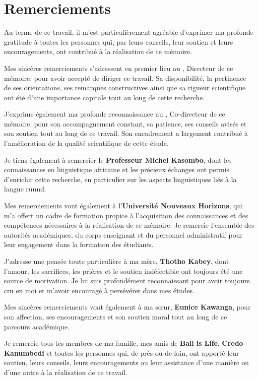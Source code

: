 \chapter*{Remerciements}
Au terme de ce travail, il m'est particulièrement agréable d'exprimer ma profonde gratitude à toutes les personnes qui, par leurs conseils, leur soutien et leurs encouragements, ont contribué à la réalisation de ce mémoire.

Mes sincères remerciements s'adressent en premier lieu au \textbf{\myProf}, Directeur de ce mémoire, pour avoir accepté de diriger ce travail. Sa disponibilité, la pertinence de ses orientations, ses remarques constructives ainsi que sa rigueur scientifique ont été d'une importance capitale tout au long de cette recherche.

J'exprime également ma profonde reconnaissance au \textbf{\mySupervisor}, Co-directeur de ce mémoire, pour son accompagnement constant, sa patience, ses conseils avisés et son soutien tout au long de ce travail. Son encadrement a largement contribué à l'amélioration de la qualité scientifique de cette étude.

Je tiens également à remercier le \textbf{Professeur Michel Kasombo}, dont les connaissances en linguistique africaine et les précieux échanges ont permis d'enrichir cette recherche, en particulier sur les aspects linguistiques liés à la langue ruund.

Mes remerciements vont également à l'\textbf{Université Nouveaux Horizons}, qui m'a offert un cadre de formation propice à l'acquisition des connaissances et des compétences nécessaires à la réalisation de ce mémoire. Je remercie l'ensemble des autorités académiques, du corps enseignant et du personnel administratif pour leur engagement dans la formation des étudiants.

J'adresse une pensée toute particulière à ma mère, \textbf{Thotho Kabey}, dont l'amour, les sacrifices, les prières et le soutien indéfectible ont toujours été une source de motivation. Je lui suis profondément reconnaissant pour avoir toujours cru en moi et m'avoir encouragé à persévérer dans mes études.

Mes sincères remerciements vont également à ma sœur, \textbf{Eunice Kawanga}, pour son affection, ses encouragements et son soutien moral tout au long de ce parcours académique.

Je remercie tous les membres de ma famille, mes amis de \textbf{Ball is Life}, \textbf{Credo Kanumbedi} et toutes les personnes qui, de près ou de loin, ont apporté leur soutien, leurs conseils, leurs encouragements ou leur assistance d'une manière ou d'une autre à la réalisation de ce travail.

\vspace{2.5cm}

\begin{flushright}
\myName
\end{flushright}